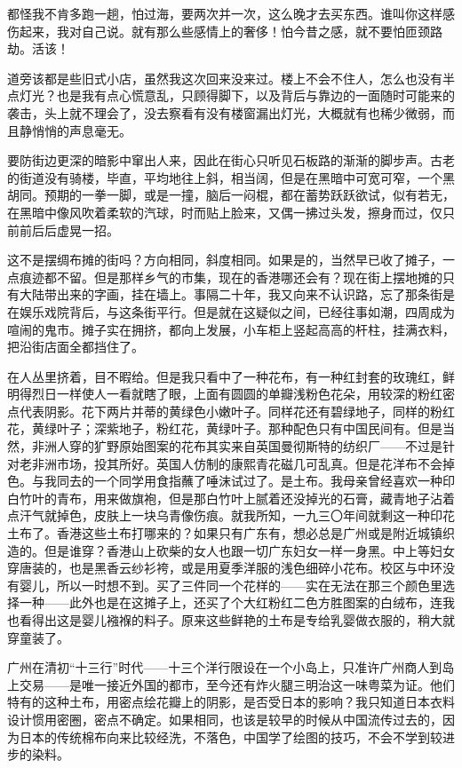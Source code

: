 \par 都怪我不肯多跑一趟，怕过海，要两次并一次，这么晚才去买东西。谁叫你这样感伤起来，我对自己说。就有那么些感情上的奢侈！怕今昔之感，就不要怕匝颈路劫。活该！
\par 道旁该都是些旧式小店，虽然我这次回来没来过。楼上不会不住人，怎么也没有半点灯光？也是我有点心慌意乱，只顾得脚下，以及背后与靠边的一面随时可能来的袭击，头上就不理会了，没去察看有没有楼窗漏出灯光，大概就有也稀少微弱，而且静悄悄的声息毫无。
\par 要防街边更深的暗影中窜出人来，因此在街心只听见石板路的渐渐的脚步声。古老的街道没有骑楼，毕直，平均地往上斜，相当阔，但是在黑暗中可宽可窄，一个黑胡同。预期的一拳一脚，或是一撞，脑后一闷棍，都在蓄势跃跃欲试，似有若无，在黑暗中像风吹着柔软的汽球，时而贴上脸来，又偶一拂过头发，擦身而过，仅只前前后后虚晃一招。
\par 这不是摆绸布摊的街吗？方向相同，斜度相同。如果是的，当然早已收了摊子，一点痕迹都不留。但是那样乡气的市集，现在的香港哪还会有？现在街上摆地摊的只有大陆带出来的字画，挂在墙上。事隔二十年，我又向来不认识路，忘了那条街是在娱乐戏院背后，与这条街平行。但是就在这疑似之间，已经往事如潮，四周成为喧闹的鬼市。摊子实在拥挤，都向上发展，小车柜上竖起高高的杆柱，挂满衣料，把沿街店面全都挡住了。
\par 在人丛里挤着，目不暇给。但是我只看中了一种花布，有一种红封套的玫瑰红，鲜明得烈日一样使人一看就瞎了眼，上面有圆圆的单瓣浅粉色花朵，用较深的粉红密点代表阴影。花下两片并蒂的黄绿色小嫩叶子。同样花还有碧绿地子，同样的粉红花，黄绿叶子；深紫地子，粉红花，黄绿叶子。那种配色只有中国民间有。但是当然，非洲人穿的犷野原始图案的花布其实来自英国曼彻斯特的纺织厂——不过是针对老非洲市场，投其所好。英国人仿制的康熙青花磁几可乱真。但是花洋布不会掉色。与我同去的一个同学用食指蘸了唾沫试过了。是土布。我母亲曾经喜欢一种印白竹叶的青布，用来做旗袍，但是那白竹叶上腻着还没掉光的石膏，藏青地子沾着点汗气就掉色，皮肤上一块乌青像伤痕。就我所知，一九三〇年间就剩这一种印花土布了。香港这些土布打哪来的？如果只有广东有，想必总是广州或是附近城镇织造的。但是谁穿？香港山上砍柴的女人也跟一切广东妇女一样一身黑。中上等妇女穿唐装的，也是黑香云纱衫袴，或是用夏季洋服的浅色细碎小花布。校区与中环没有婴儿，所以一时想不到。买了三件同一个花样的——实在无法在那三个颜色里选择一种——此外也是在这摊子上，还买了个大红粉红二色方胜图案的白绒布，连我也看得出这是婴儿襁褓的料子。原来这些鲜艳的土布是专给乳婴做衣服的，稍大就穿童装了。
\par 广州在清初“十三行”时代——十三个洋行限设在一个小岛上，只准许广州商人到岛上交易——是唯一接近外国的都市，至今还有炸火腿三明治这一味粤菜为证。他们特有的这种土布，用密点绘花瓣上的阴影，是否受日本的影响？我只知道日本衣料设计惯用密圈，密点不确定。如果相同，也该是较早的时候从中国流传过去的，因为日本的传统棉布向来比较经洗，不落色，中国学了绘图的技巧，不会不学到较进步的染料。
